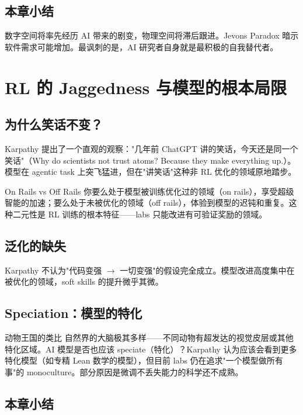 \documentclass[a4paper]{article}
\begin{document}
\subsection{本章小结}

数字空间将率先经历 AI 带来的剧变，物理空间将滞后跟进。Jevons Paradox 暗示软件需求可能增加。最讽刺的是，AI 研究者自身就是最积极的自我替代者。


\section{RL 的 Jaggedness 与模型的根本局限}

\subsection{为什么笑话不变？}

Karpathy 提出了一个直观的观察："几年前 ChatGPT 讲的笑话，今天还是同一个笑话"（Why do scientists not trust atoms? Because they make everything up.）。模型在 agentic task 上突飞猛进，但在"讲笑话"这种非 RL 优化的领域原地踏步。

\begin{importantbox}{On Rails vs Off Rails}
你要么处于模型被训练优化过的领域（on rails），享受超级智能的加速；要么处于未被优化的领域（off rails），体验到模型的迟钝和重复。这种二元性是 RL 训练的根本特征——labs 只能改进有可验证奖励的领域。
\end{importantbox}

\subsection{泛化的缺失}

Karpathy 不认为"代码变强 $\rightarrow$ 一切变强"的假设完全成立。模型改进高度集中在被优化的领域，soft skills 的提升微乎其微。

\subsection{Speciation：模型的特化}

\begin{knowledgebox}{动物王国的类比}
自然界的大脑极其多样——不同动物有超发达的视觉皮层或其他特化区域。AI 模型是否也应该 speciate（特化）？Karpathy 认为应该会看到更多特化模型（如专精 Lean 数学的模型），但目前 labs 仍在追求"一个模型做所有事"的 monoculture。部分原因是微调不丢失能力的科学还不成熟。
\end{knowledgebox}

\subsection{本章小结}
\end{document}
